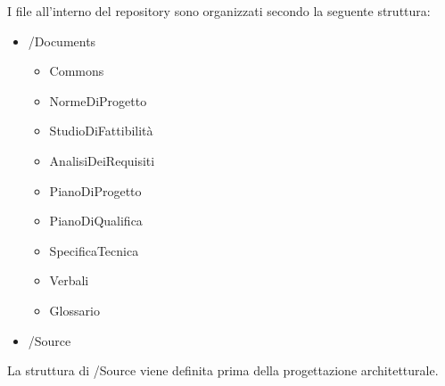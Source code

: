 					I file all’interno del repository sono organizzati secondo la seguente struttura:
					\begin{itemize}
						\item /Documents
						\begin{itemize}
							\item Commons
							\item NormeDiProgetto
							\item StudioDiFattibilità
							\item AnalisiDeiRequisiti
							\item PianoDiProgetto
							\item PianoDiQualifica
							\item SpecificaTecnica
							\item Verbali
							\item Glossario
						\end{itemize}
						\item /Source
					\end{itemize}
					La struttura di /Source viene definita prima della progettazione architetturale.


